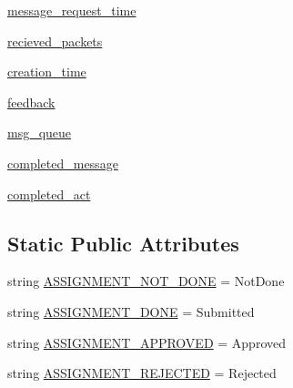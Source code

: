 \begin{DoxyCompactItemize}
\item 
\hyperlink{classparlai_1_1mturk_1_1core_1_1dev_1_1agents_1_1MTurkAgent_ab924c05dcc31a71c99b2e360dd8f4477}{message\+\_\+request\+\_\+time}
\item 
\hyperlink{classparlai_1_1mturk_1_1core_1_1dev_1_1agents_1_1MTurkAgent_a92f02000f55dc982d47299b41f630f18}{recieved\+\_\+packets}
\item 
\hyperlink{classparlai_1_1mturk_1_1core_1_1dev_1_1agents_1_1MTurkAgent_a4ccc514385183d4189d008dd3fe29dc3}{creation\+\_\+time}
\item 
\hyperlink{classparlai_1_1mturk_1_1core_1_1dev_1_1agents_1_1MTurkAgent_a2fe8f89ab693d56a6640138b4133132a}{feedback}
\item 
\hyperlink{classparlai_1_1mturk_1_1core_1_1dev_1_1agents_1_1MTurkAgent_a3bcf53409f598de0b9842df12f5b70f9}{msg\+\_\+queue}
\item 
\hyperlink{classparlai_1_1mturk_1_1core_1_1dev_1_1agents_1_1MTurkAgent_ad613c6468e4e8c6d3a5139628e28808b}{completed\+\_\+message}
\item 
\hyperlink{classparlai_1_1mturk_1_1core_1_1dev_1_1agents_1_1MTurkAgent_a7f552df348f725e022bc6d5ece942d49}{completed\+\_\+act}
\end{DoxyCompactItemize}
\subsection*{Static Public Attributes}
\begin{DoxyCompactItemize}
\item 
string \hyperlink{classparlai_1_1mturk_1_1core_1_1dev_1_1agents_1_1MTurkAgent_a7ae94a33dcdde27b8eee312837072955}{A\+S\+S\+I\+G\+N\+M\+E\+N\+T\+\_\+\+N\+O\+T\+\_\+\+D\+O\+NE} = \textquotesingle{}Not\+Done\textquotesingle{}
\item 
string \hyperlink{classparlai_1_1mturk_1_1core_1_1dev_1_1agents_1_1MTurkAgent_aa9298f1be3bdb8d37585fdd5e44ea98d}{A\+S\+S\+I\+G\+N\+M\+E\+N\+T\+\_\+\+D\+O\+NE} = \textquotesingle{}Submitted\textquotesingle{}
\item 
string \hyperlink{classparlai_1_1mturk_1_1core_1_1dev_1_1agents_1_1MTurkAgent_a2dc63efc81daef41c3676caa9cee6f3e}{A\+S\+S\+I\+G\+N\+M\+E\+N\+T\+\_\+\+A\+P\+P\+R\+O\+V\+ED} = \textquotesingle{}Approved\textquotesingle{}
\item 
string \hyperlink{classparlai_1_1mturk_1_1core_1_1dev_1_1agents_1_1MTurkAgent_ae9905a0e43189c0c9975f40679d80beb}{A\+S\+S\+I\+G\+N\+M\+E\+N\+T\+\_\+\+R\+E\+J\+E\+C\+T\+ED} = \textquotesingle{}Rejected\textquotesingle{}
\end{DoxyCompactItemize}


